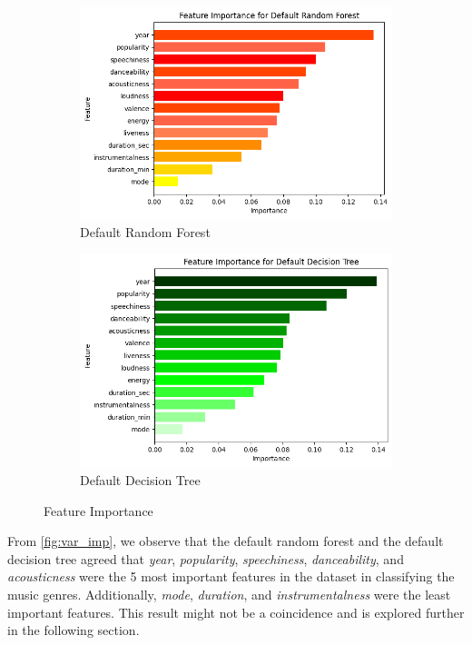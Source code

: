 \documentclass{article}
\begin{document}
\begin{figure}[htbp]
    \centering
    \begin{subfigure}[b]{0.45\textwidth}
        \centering
        \includegraphics[width=\textwidth]{rf_var_imp.png}
        \caption{Default Random Forest}
    \end{subfigure}
    \hfill
    \begin{subfigure}[b]{0.45\textwidth}
        \centering
        \includegraphics[width=\textwidth]{dt_var_imp.png}
        \caption{Default Decision Tree}
    \end{subfigure}
    \caption{Feature Importance}
    \label{fig:var_imp}
\end{figure}

From \autoref*{fig:var_imp}, we observe that the default random forest and the default decision tree agreed that \textit{year}, \textit{popularity}, \textit{speechiness}, \textit{danceability}, and \textit{acousticness} were the 5 most important features in the dataset in classifying the music genres. Additionally, \textit{mode}, \textit{duration}, and \textit{instrumentalness} were the least important features. This result might not be a coincidence and is explored further in the following section.
\end{document}
